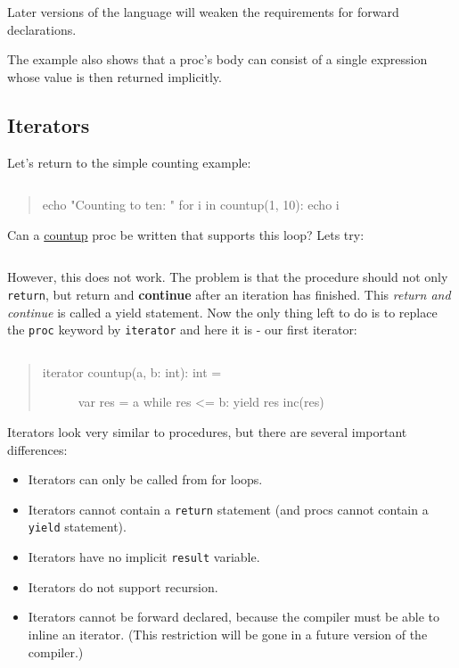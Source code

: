 Later versions of the language will weaken the requirements for forward
declarations.

The example also shows that a proc's body can consist of a single
expression whose value is then returned implicitly.

\hypertarget{iterators}{%
\subsection{Iterators}\label{iterators}}

Let's return to the simple counting example:

\begin{verbatim}
\end{verbatim}

\begin{quote}
echo "Counting to ten: " for i in countup(1, 10): echo i
\end{quote}

Can a \href{system.html\#countup.i,T,T,Positive}{countup} proc be
written that supports this loop? Lets try:

\begin{verbatim}
\end{verbatim}

However, this does not work. The problem is that the procedure should
not only \texttt{return}, but return and \textbf{continue} after an
iteration has finished. This \emph{return and continue} is called a
{yield} statement. Now the only thing left to do is to replace the
\texttt{proc} keyword by \texttt{iterator} and here it is - our first
iterator:

\begin{verbatim}
\end{verbatim}

\begin{quote}
\begin{description}
\item[iterator countup(a, b: int): int =]
var res = a while res \textless= b: yield res inc(res)
\end{description}
\end{quote}

Iterators look very similar to procedures, but there are several
important differences:

\begin{itemize}
\tightlist
\item
  Iterators can only be called from for loops.
\item
  Iterators cannot contain a \texttt{return} statement (and procs cannot
  contain a \texttt{yield} statement).
\item
  Iterators have no implicit \texttt{result} variable.
\item
  Iterators do not support recursion.
\item
  Iterators cannot be forward declared, because the compiler must be
  able to inline an iterator. (This restriction will be gone in a future
  version of the compiler.)
\end{itemize}

